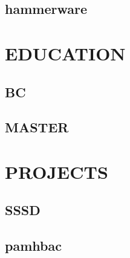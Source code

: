 \documentclass{mycv}
\begin{document}
\begin{paracol}{3}
\subsection{hammerware}

\section{EDUCATION}
\subsection{BC}
\subsection{MASTER}

\end{paracol}

\newpage

\section{PROJECTS}

\subsection{SSSD}

\subsection{pamhbac}

\faGithub
\faTwitter
\faMale
\end{document}

